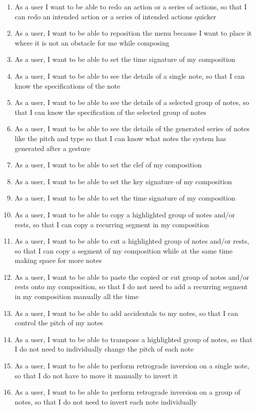 \begin{enumerate}
\item As a user I want to be able to redo an action or a series of actions, so that I can redo an intended action or a series of intended actions quicker
\item As a user, I want to be able to reposition the menu because I want to place it where it is not an obstacle for me while composing
\item As a user, I want to be able to set the time signature of my composition
\item As a user, I want to be able to see the details of a single note, so that I can know the specifications of the note
\item As a user, I want to be able to see the details of a selected group of notes, so that I can know the specification of the selected group of notes
\item As a user, I want to be able to see the details of the generated series of notes like the pitch and type so that I can know what notes the system has generated after a gesture
\item As a user, I want to be able to set the clef of my composition
\item As a user, I want to be able to set the key signature of my composition
\item As a user, I want to be able to set the time signature of my composition
\item As a user, I want to be able to copy a highlighted group of notes and/or rests, so that I can copy a recurring segment in my composition
\item As a user, I want to be able to cut a highlighted group of notes and/or rests, so that I can copy a segment of my composition while at the same time making space for more notes
\item As a user, I want to be able to paste the copied or cut group of notes and/or rests onto my composition, so that I do not need to add a recurring segment in my composition manually all the time
\item As a user, I want to be able to add accidentals to my notes, so that I can control the pitch of my notes
\item As a user, I want to be able to transpose a highlighted group of notes, so that I do not need to individually change the pitch of each note
\item As a user, I want to be able to perform retrograde inversion on a single note, so that I do not have to move it manually to invert it
\item As a user, I want to be able to perform retrograde inversion on a group of notes, so that I do not need to invert each note individually

\end{enumerate}

